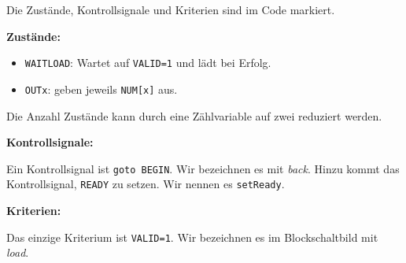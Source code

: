 \documentclass{CInf_practice}
\begin{document}




Die Zustände, Kontrollsignale und Kriterien sind im Code markiert.

\bigskip

\textbf{Zustände:}

\begin{itemize}
	\item \texttt{WAITLOAD}: Wartet auf \texttt{VALID=1} und lädt bei Erfolg.
  \item \texttt{OUTx}: geben jeweils \texttt{NUM[x]} aus.
\end{itemize}

Die Anzahl Zustände kann durch eine Zählvariable auf zwei reduziert werden.

\bigskip

\textbf{Kontrollsignale:}

Ein Kontrollsignal ist \texttt{goto BEGIN}. Wir bezeichnen es mit \emph{back}. Hinzu kommt das Kontrollsignal, \texttt{READY} zu setzen. Wir nennen es \texttt{setReady}. 

\bigskip

\textbf{Kriterien:}

Das einzige Kriterium ist \texttt{VALID=1}. Wir bezeichnen es im Blockschaltbild mit \emph{load}.
\end{document}

